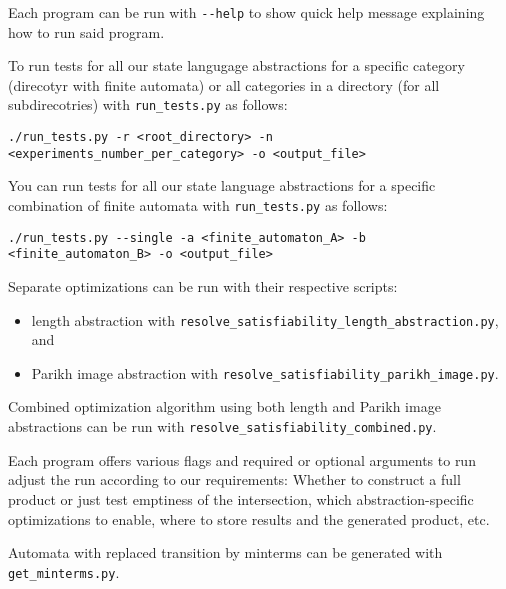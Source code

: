Each program can be run with \texttt{-\--help} to show quick help message explaining how to run said program.



To run tests for all our state langugage abstractions for a specific category (direcotyr with finite automata) or all categories in a directory (for all subdirecotries) with \texttt{run\_tests.py} as follows:

{
    \centering \footnotesize \texttt{./run\_tests.py -r <root\_directory> -n <experiments\_number\_per\_category> -o <output\_file>}
}

You can run tests for all our state language abstractions for a specific combination of finite automata with \texttt{run\_tests.py} as follows:

{
    \centering \footnotesize \texttt{./run\_tests.py -\--single -a <finite\_automaton\_A> -b <finite\_automaton\_B> -o <output\_file>}
}

Separate optimizations can be run with their respective scripts:
\begin{itemize}
    \item length abstraction with \texttt{resolve\_satisfiability\_length\_abstraction.py}, and
    \item Parikh image abstraction with \texttt{resolve\_satisfiability\_parikh\_image.py}.
\end{itemize}
Combined optimization algorithm using both length and Parikh image abstractions can be run with \texttt{resolve\_satisfiability\_combined.py}.

Each program offers various flags and required or optional arguments to run adjust the run according to our requirements: Whether to construct a full product or just test emptiness of the intersection, which abstraction-specific optimizations to enable, where to store results and the generated product, etc.

Automata with replaced transition by minterms can be generated with \texttt{get\_minterms.py}.




